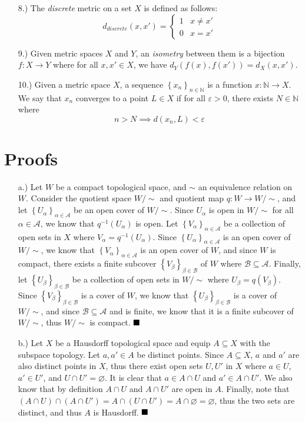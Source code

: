 \documentclass[12pt]{article}
\newcommand{\done}{
    \ensuremath{\strut\hfill\blacksquare}
}
\newcommand{\braces}[1]{\left\{#1\right\}}           %
\newcommand{\N}{\mathbb{N}}
\newcommand{\e}{\varepsilon}
\begin{document}
\begin{itemize}
    \item [8.)] The \textit{discrete} metric on a set $X$ is defined as follows:
    \[d_{discrete}(x,x')=\begin{cases}
        1 & x\ne x' \\
        0 & x=x'
    \end{cases}\]

    \item [9.)] Given metric spaces $X$ and $Y$, an \textit{isometry} between them is a bijection $f:X\to Y$ where for all $x,x'\in X$, we have $d_Y(f(x),f(x'))=d_X(x,x')$.

    \item [10.)] Given a metric space $X$, a sequence $\braces{x_n}_{n\in\N}$ is a function $x:\N\to X$. We say that $x_n$ converges to a point $L\in X$ if for all $\e>0$, there exists $N\in\N$ where
    \[n>N\implies d(x_n,L)<\e\]
\end{itemize}

\section*{Proofs}
\begin{itemize}
    \item [a.)] Let $W$ be a compact topological space, and $\sim$ an equivalence relation on $W$. Consider the quotient space $W/{\sim}$ and quotient map $q:W\to W/{\sim}$, and let $\braces{U_\alpha}_{\alpha\in\mathcal{A}}$ be an open cover of $W/{\sim}$. Since $U_\alpha$ is open in $W/{\sim}$ for all $\alpha\in\mathcal{A}$, we know that $q^{-1}(U_\alpha)$ is open. Let $\braces{V_\alpha}_{\alpha\in\mathcal{A}}$ be a collection of open sets in $X$ where $V_\alpha=q^{-1}(U_\alpha)$. Since $\braces{U_\alpha}_{\alpha\in\mathcal{A}}$ is an open cover of $W/{\sim}$, we know that $\braces{V_\alpha}_{\alpha\in\mathcal{A}}$ is an open cover of $W$, and since $W$ is compact, there exists a finite subcover $\braces{V_\beta}_{\beta\in\mathcal{B}}$ of $W$ where $\mathcal{B}\subseteq\mathcal{A}$. Finally, let $\braces{U_\beta}_{\beta\in\mathcal{B}}$ be a collection of open sets in $W/{\sim}$ where $U_\beta=q(V_\beta)$. Since $\braces{V_\beta}_{\beta\in\mathcal{B}}$ is a cover of $W$, we know that $\braces{U_\beta}_{\beta\in\mathcal{B}}$ is a cover of $W/{\sim}$, and since $\mathcal{B}\subseteq\mathcal{A}$ and is finite, we know that it is a finite subcover of $W/{\sim}$, thus $W/{\sim}$ is compact. \done

    \item [b.)] Let $X$ be a Hausdorff topological space and equip $A\subseteq X$ with the subspace topology. Let $a,a'\in A$ be distinct points. Since $A\subseteq X$, $a$ and $a'$ are also distinct points in $X$, thus there exist open sets $U,U'$ in $X$ where $a\in U$, $a'\in U'$, and $U\cap U'=\varnothing$. It is clear that $a\in A\cap U$ and $a'\in A\cap U'$. We also know that by definition $A\cap U$ and $A\cap U'$ are open in $A$. Finally, note that $(A\cap U)\cap(A\cap U')=A\cap(U\cap U')=A\cap\varnothing=\varnothing$, thus the two sets are distinct, and thus $A$ is Hausdorff. \done
\end{itemize}
\end{document}

